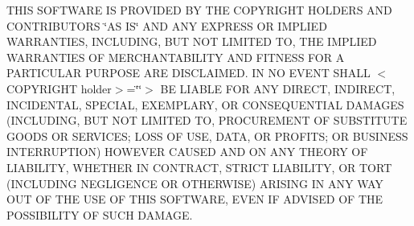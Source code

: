 T\+H\+IS S\+O\+F\+T\+W\+A\+RE IS P\+R\+O\+V\+I\+D\+ED BY T\+HE C\+O\+P\+Y\+R\+I\+G\+HT H\+O\+L\+D\+E\+RS A\+ND C\+O\+N\+T\+R\+I\+B\+U\+T\+O\+RS \char`\"{}\+A\+S I\+S\char`\"{} A\+ND A\+NY E\+X\+P\+R\+E\+SS OR I\+M\+P\+L\+I\+ED W\+A\+R\+R\+A\+N\+T\+I\+ES, I\+N\+C\+L\+U\+D\+I\+NG, B\+UT N\+OT L\+I\+M\+I\+T\+ED TO, T\+HE I\+M\+P\+L\+I\+ED W\+A\+R\+R\+A\+N\+T\+I\+ES OF M\+E\+R\+C\+H\+A\+N\+T\+A\+B\+I\+L\+I\+TY A\+ND F\+I\+T\+N\+E\+SS F\+OR A P\+A\+R\+T\+I\+C\+U\+L\+AR P\+U\+R\+P\+O\+SE A\+RE D\+I\+S\+C\+L\+A\+I\+M\+ED. IN NO E\+V\+E\+NT S\+H\+A\+LL $<$\+C\+O\+P\+Y\+R\+I\+G\+H\+T holder$>$=\char`\"{}\char`\"{}$>$ BE L\+I\+A\+B\+LE F\+OR A\+NY D\+I\+R\+E\+CT, I\+N\+D\+I\+R\+E\+CT, I\+N\+C\+I\+D\+E\+N\+T\+AL, S\+P\+E\+C\+I\+AL, E\+X\+E\+M\+P\+L\+A\+RY, OR C\+O\+N\+S\+E\+Q\+U\+E\+N\+T\+I\+AL D\+A\+M\+A\+G\+ES (I\+N\+C\+L\+U\+D\+I\+NG, B\+UT N\+OT L\+I\+M\+I\+T\+ED TO, P\+R\+O\+C\+U\+R\+E\+M\+E\+NT OF S\+U\+B\+S\+T\+I\+T\+U\+TE G\+O\+O\+DS OR S\+E\+R\+V\+I\+C\+ES; L\+O\+SS OF U\+SE, D\+A\+TA, OR P\+R\+O\+F\+I\+TS; OR B\+U\+S\+I\+N\+E\+SS I\+N\+T\+E\+R\+R\+U\+P\+T\+I\+ON) H\+O\+W\+E\+V\+ER C\+A\+U\+S\+ED A\+ND ON A\+NY T\+H\+E\+O\+RY OF L\+I\+A\+B\+I\+L\+I\+TY, W\+H\+E\+T\+H\+ER IN C\+O\+N\+T\+R\+A\+CT, S\+T\+R\+I\+CT L\+I\+A\+B\+I\+L\+I\+TY, OR T\+O\+RT (I\+N\+C\+L\+U\+D\+I\+NG N\+E\+G\+L\+I\+G\+E\+N\+CE OR O\+T\+H\+E\+R\+W\+I\+SE) A\+R\+I\+S\+I\+NG IN A\+NY W\+AY O\+UT OF T\+HE U\+SE OF T\+H\+IS S\+O\+F\+T\+W\+A\+RE, E\+V\+EN IF A\+D\+V\+I\+S\+ED OF T\+HE P\+O\+S\+S\+I\+B\+I\+L\+I\+TY OF S\+U\+CH D\+A\+M\+A\+GE. 